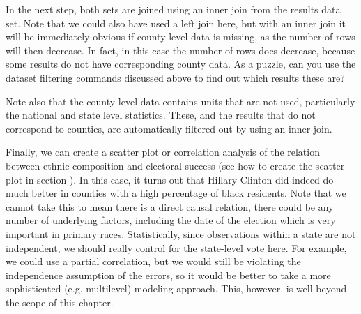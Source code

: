 In the next step, both sets are joined using an inner join from the results data set.
Note that we could also have used a left join here, but with an inner join it will be immediately
obvious if county level data is missing, as the number of rows will then decrease.
In fact, in this case the number of rows does decrease, because some results do not have corresponding county data.
As a puzzle, can you use the dataset filtering commands discussed above to find out which results these are?

Note also that the county level data contains units that are not used, particularly the national and state level statistics.
These, and the results that do not correspond to counties, are automatically filtered out by using an inner join.

Finally, we can create a scatter plot or correlation analysis of the relation between ethnic composition and electoral success (see how to create the scatter plot in section ).
In this case, it turns out that Hillary Clinton did indeed do much better in counties with a high percentage of black residents.
Note that we cannot take this to mean there is a direct causal relation, there could be any number of underlying factors, including the date of the election which is very important in primary races.
Statistically, since observations within a state are not independent, we should really control for the state-level vote here.
For example, we could use a partial correlation, but we would still be violating the independence assumption of the errors,
so it would be better to take a more sophisticated (e.g. multilevel) modeling approach. This, however, is well beyond the scope
of this chapter. 

